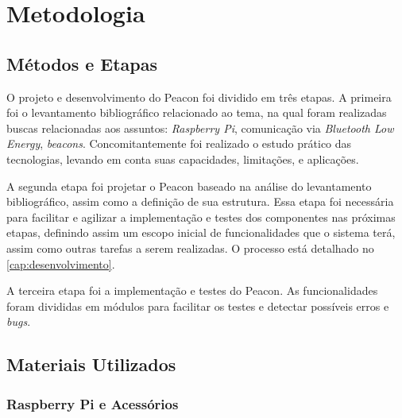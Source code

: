 \chapter{Metodologia}\label{cap:metodologia}

\section{Métodos e Etapas}\label{sec:metodos-etapas}

O projeto e desenvolvimento do Peacon foi dividido em três etapas. A primeira foi o levantamento bibliográfico relacionado ao tema, na qual foram realizadas buscas relacionadas aos assuntos: \textit{Raspberry Pi}, comunicação via \textit{Bluetooth Low Energy}, \textit{beacons}. Concomitantemente foi realizado o estudo prático das tecnologias, levando em conta suas capacidades, limitações, e aplicações.

A segunda etapa foi projetar o Peacon baseado na análise do levantamento bibliográfico, assim como a definição de sua estrutura. Essa etapa foi necessária para facilitar e agilizar a implementação e testes dos componentes nas próximas etapas, definindo assim um escopo inicial de funcionalidades que o sistema terá, assim como outras tarefas a serem realizadas. O processo está detalhado no \autoref{cap:desenvolvimento}.

A terceira etapa foi a implementação e testes do Peacon. As funcionalidades foram divididas em módulos para facilitar os testes e detectar possíveis erros e \textit{bugs}.

\section{Materiais Utilizados}\label{sec:materiais-utilizados}

\subsection{Raspberry Pi e Acessórios}\label{sec:rpi-acessorios}

